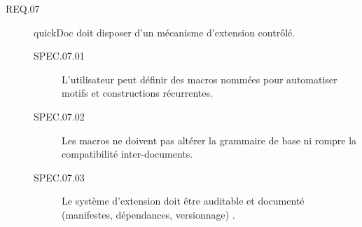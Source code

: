 \documentclass[a4paper,12pt]{article}
\begin{document}
\begin{description}
\item[{\label{org407285e}REQ.07}] quickDoc doit disposer d’un mécanisme d’extension contrôlé.
\begin{description}
\item[{\label{orgba158aa}SPEC.07.01}] L’utilisateur peut définir des macros nommées pour automatiser motifs et constructions récurrentes.
\item[{\label{org18723e5}SPEC.07.02}] Les macros ne doivent pas altérer la grammaire de base ni rompre la compatibilité inter-documents.
\item[{\label{orgbc219f9}SPEC.07.03}] Le système d’extension doit être auditable et documenté (manifestes, dépendances, versionnage) \autocite{EclipseProjectsAsciiDoc2025,GithubSpeckit2025}.
\end{description}
\end{description}
\end{document}
